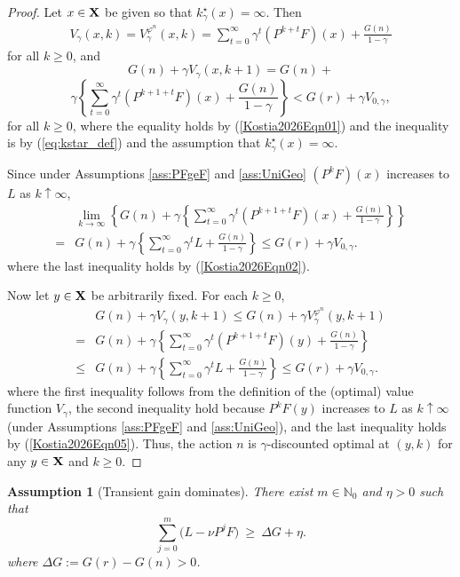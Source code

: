 \documentclass[letterpaper,10pt,conference]{ieeeconf}  %
\newtheorem{assumption}{Assumption}
\begin{document}
\begin{proof}
Let $x\in {\bf X}$ be given so that $k^\star_\gamma(x)=\infty$. Then 
\begin{align}\label{Kostia2026Eqn01}
V_\gamma(x,k)=V_\gamma^{\varphi^n}(x,k)= \sum_{t=0}^{\infty}\gamma^{t} (P^{k+t}F)(x) + \frac{G(n)}{1-\gamma}
\end{align}
for all $k\ge 0$,
and
\begin{equation}
\label{Kostia2026Eqn02}
G(n)+\gamma V_\gamma(x,k+1)=G(n)+
\end{equation}
\[
\gamma \left\{ \sum_{t=0}^\infty  \gamma^t(P^{k+1+t}F)(x)+\frac{G(n)}{1-\gamma}\right\} < G(r)+\gamma V_{0,\gamma},
\]
for all $k\ge 0$, where the equality holds by (\ref{Kostia2026Eqn01}) and the inequality is by (\ref{eq:kstar_def}) and the assumption that $k^\star_\gamma(x)=\infty$.

Since under Assumptions \ref{ass:PFgeF} and \ref{ass:UniGeo}    $(P^k F)(x)$ increases to $L$ as $k\uparrow\infty$,
\begin{align}\label{Kostia2026Eqn05}
 &\lim_{k\rightarrow \infty}\left\{G(n)+\gamma \left\{ \sum_{t=0}^\infty  \gamma^t(P^{k+1+t}F)(x)+\frac{G(n)}{1-\gamma}\right\}\right\} \nonumber\\
=& G(n)+\gamma \left\{ \sum_{t=0}^\infty  \gamma^tL+\frac{G(n)}{1-\gamma}\right\}
 \le G(r)+\gamma V_{0,\gamma}.
\end{align}
where the last inequality holds by (\ref{Kostia2026Eqn02}). 

Now let $y\in {\bf X}$ be arbitrarily fixed. 
For each $k\ge 0$, 
\begin{align*}
&G(n)+\gamma V_\gamma(y,k+1)\le G(n) +\gamma V_\gamma^{\varphi^n}(y,k+1)\\
=&  G(n)+\gamma \left\{ \sum_{t=0}^\infty  \gamma^t(P^{k+1+t}F)(y)+\frac{G(n)}{1-\gamma}\right\}\\
\le & G(n)+\gamma \left\{ \sum_{t=0}^\infty  \gamma^tL+\frac{G(n)}{1-\gamma}\right\}
\le G(r)+\gamma V_{0,\gamma}. 
\end{align*}
where the first inequality follows from the definition of the (optimal) value function $V_\gamma$, the second inequality hold because $P^kF(y)$ increases to $L$ as $k\uparrow \infty$ (under Assumptions \ref{ass:PFgeF} and \ref{ass:UniGeo}), and the last inequality holds by (\ref{Kostia2026Eqn05}). Thus, the action $n$ is $\gamma$-discounted optimal at $(y,k)$ for any $y\in{\bf X}$ and $k\ge 0.$ 
\end{proof}

\begin{assumption}[Transient gain dominates]
\label{ass:TG}
There exist $m\in\mathbb N_0$ and $\eta>0$ such that
\begin{equation}\label{eq:A3_TG}
\sum_{j=0}^{m}\Big(L-\nu P^jF\Big)\ \ge\ \Delta G+\eta.
\end{equation}
where $\Delta G := G(r)-G(n) > 0$.
\end{assumption}
\smallskip
\end{document}
